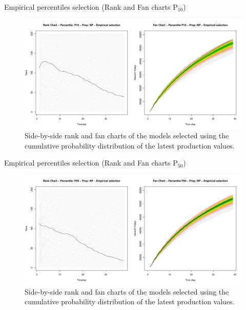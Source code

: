 \documentclass{beamer}
\begin{document}
\begin{frame}{Empirical percentiles selection (Rank and Fan charts P$_{10}$)}
  \begin{figure}[H]
    \centering
    \includegraphics[width=0.9\columnwidth]{rank-fan-ecdf-p10.pdf}
    \caption{Side-by-side rank and fan charts of the models selected using the cumulative probability distribution of the latest production values.}
    \label{fig:rank-fan-ecdf}
  \end{figure}
\end{frame}

\begin{frame}{Empirical percentiles selection (Rank and Fan charts P$_{50}$)}
  \begin{figure}[H]
    \centering
    \includegraphics[width=0.9\columnwidth]{rank-fan-ecdf-p50.pdf}
    \caption{Side-by-side rank and fan charts of the models selected using the cumulative probability distribution of the latest production values.}
    \label{fig:rank-fan-ecdf}
  \end{figure}
\end{frame}
\end{document}
